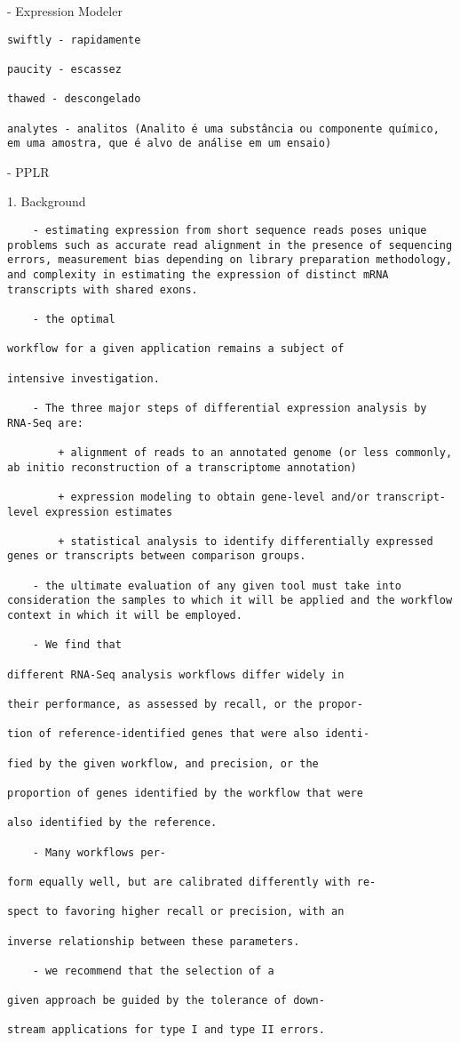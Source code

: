 \documentclass[
]{book}
\begin{document}
- Expression Modeler

\begin{verbatim}
swiftly - rapidamente

paucity - escassez

thawed - descongelado

analytes - analitos (Analito é uma substância ou componente químico, em uma amostra, que é alvo de análise em um ensaio)
\end{verbatim}

- PPLR

1. Background

\begin{verbatim}
    - estimating expression from short sequence reads poses unique problems such as accurate read alignment in the presence of sequencing errors, measurement bias depending on library preparation methodology, and complexity in estimating the expression of distinct mRNA transcripts with shared exons.

    - the optimal

workflow for a given application remains a subject of

intensive investigation.

    - The three major steps of differential expression analysis by RNA-Seq are:

        + alignment of reads to an annotated genome (or less commonly, ab initio reconstruction of a transcriptome annotation)

        + expression modeling to obtain gene-level and/or transcript-level expression estimates

        + statistical analysis to identify differentially expressed genes or transcripts between comparison groups.

    - the ultimate evaluation of any given tool must take into consideration the samples to which it will be applied and the workflow context in which it will be employed.

    - We find that

different RNA-Seq analysis workflows differ widely in

their performance, as assessed by recall, or the propor-

tion of reference-identified genes that were also identi-

fied by the given workflow, and precision, or the

proportion of genes identified by the workflow that were

also identified by the reference.

    - Many workflows per-

form equally well, but are calibrated differently with re-

spect to favoring higher recall or precision, with an

inverse relationship between these parameters.

    - we recommend that the selection of a

given approach be guided by the tolerance of down-

stream applications for type I and type II errors.
\end{verbatim}
\end{document}
